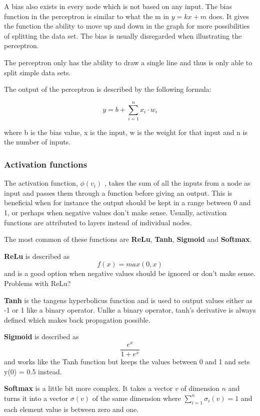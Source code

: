 A bias also exists in every node which is not based on any input. The bias function in the perceptron is similar to what the m in $y = kx + m$ does. It gives the function the ability to move up and down in the graph for more possibilities of splitting the data set. The bias is usually disregarded when illustrating the perceptron.

The perceptron only has the ability to draw a single line and thus is only able to split simple data sets.

The output of the perceptron is described by the following formula:

\[ y = b + \displaystyle\sum_{i=1}^{n} x_i \cdot w_i \]

where b is the bias value, x is the input, w is the weight for that input and n is the number of inputs.

\subsubsection{Activation functions}

The activation function,  $ \phi (v_{i}) $ , takes the sum of all the inputs from a node as input and passes them through a function before giving an output. This is beneficial when for instance the output should be kept in a range between 0 and 1, or perhaps when negative values don't make sense.
Usually, activation functions are attributed to layers instead of individual nodes.

The most common of these functions are \textbf{ReLu}, \textbf{Tanh}, \textbf{Sigmoid} and \textbf{Softmax}.

\textbf{ReLu} is described as
\[f(x) = max(0, x)\]
and is a good option when negative values should be ignored or don't make sense. Problems with ReLu?

\textbf{Tanh} is the tangens hyperbolicus function and is used to output values either as -1 or 1 like a binary operator. Unlke a binary operator, tanh's derivative is always defined which makes back propagation possible.

\textbf{Sigmoid} is described as 
\[\frac{e^x}{1+e^x}\]
and works like the Tanh function but keeps the values between 0 and 1 and sets y(0) = 0.5 instead.

\textbf{Softmax} is a little bit more complex. It takes a vector $v$ of dimension $n$ and turns it into a vector $\sigma(v)$ of the same dimension where $\displaystyle\sum_{i=1}^{n} \sigma_i(v) = 1 $ and each element value is between zero and one.

